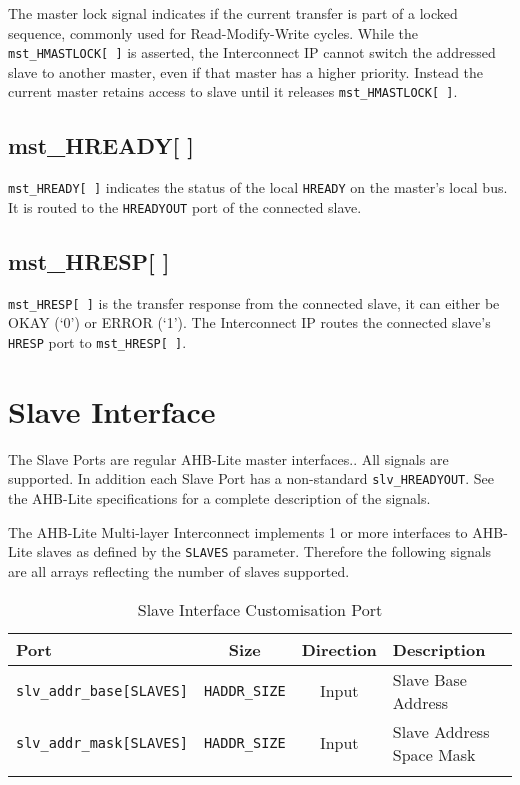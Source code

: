 The master lock signal indicates if the current transfer is part of a
locked sequence, commonly used for Read-Modify-Write cycles. While the
\texttt{mst\_HMASTLOCK[\,]} is asserted, the Interconnect IP cannot switch the
addressed slave to another master, even if that master has a higher
priority. Instead the current master retains access to slave until it
releases \texttt{mst\_HMASTLOCK[\,]}.

\subsection{mst\_HREADY[ ]}\label{mst_hready}

\texttt{mst\_HREADY[\,]} indicates the status of the local \texttt{HREADY} on the master's
local bus. It is routed to the \texttt{HREADYOUT} port of the connected slave.

\subsection{mst\_HRESP[ ]}\label{mst_hresp}

\texttt{mst\_HRESP[\,]} is the transfer response from the connected slave, it can
either be OKAY (`0') or ERROR (`1'). The Interconnect IP routes the
connected slave's \texttt{HRESP} port to \texttt{mst\_HRESP[\,]}.

\section{Slave Interface}\label{slave-interface}

The Slave Ports are regular AHB-Lite master interfaces.. All signals are
supported. In addition each Slave Port has a non-standard
\texttt{slv\_HREADYOUT}. See the AHB-Lite specifications for a complete
description of the signals.

The AHB-Lite Multi-layer Interconnect implements 1 or more interfaces to AHB-Lite slaves
as defined by the \texttt{SLAVES} parameter. Therefore the following signals are all
arrays reflecting the number of slaves supported.

\begin{longtable}[]{@{}lccl@{}}
\toprule
Port & Size & Direction & Description\tabularnewline
\midrule
\endhead
\texttt{slv\_addr\_base[SLAVES]} & \texttt{HADDR\_SIZE} & Input  & Slave Base Address\tabularnewline
\texttt{slv\_addr\_mask[SLAVES]} & \texttt{HADDR\_SIZE} & Input  & Slave Address Space Mask\tabularnewline
\bottomrule
\caption{Slave Interface Customisation Port}
\end{longtable}

